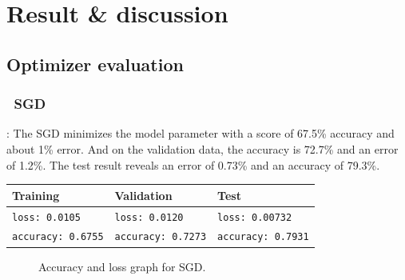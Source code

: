 \documentclass[lnbip]{svmultln}
\newcommand{\myfloatalign}{\centering}
\begin{document}
	


%
\section{Result \& discussion}
%	
	\subsection{Optimizer evaluation}
	\subsubsection*{\qquad \textbullet \ \textbf{SGD}}:
	The SGD minimizes the model parameter with a score of 67.5\% accuracy and about 1\% error. And on the validation data, the accuracy is 72.7\% and an error of 1.2\%. The test result reveals an error of 0.73\% and an accuracy of 79.3\%. 

	
	\begin{table}[H]
		\centering
		\begin{tabular}{l|l|l}
			\hline
			\textbf{Training} & \textbf{Validation} & \textbf{Test} \\
			\hline
			
			\texttt{loss: 0.0105} & \texttt{loss: 0.0120} & \texttt{loss: 0.00732} \\
			\texttt{accuracy: 0.6755} & \texttt{accuracy: 0.7273} & \texttt{accuracy: 0.7931} \\
			
			\hline
			
		\end{tabular}
	\end{table}
	
	\begin{figure}[H]
		\myfloatalign
		 \quad
		
		\caption{Accuracy and loss graph for SGD.}
	\end{figure}
\end{document}
